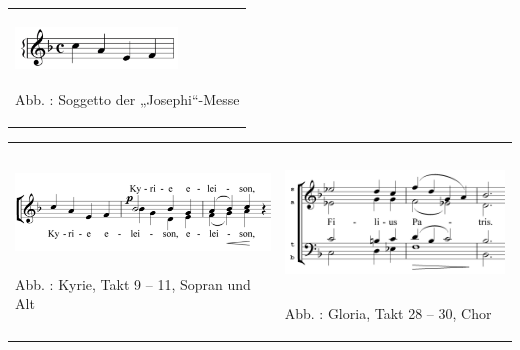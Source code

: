 \begin{center}
\begin{minipage}{4.736cm}
\begin{flushleft}
\tablefirsthead{}
\tablehead{}
\tabletail{}
\tablelasttail{}
\begin{supertabular}{m{4.5360003cm}}

\includegraphics[width=4.307cm,height=1.233cm]{pictures/zulassungsarbeit-img108.png}

Abb. : Soggetto der „Josephi“-Messe\\
\end{supertabular}
\end{flushleft}
\end{minipage}
\end{center}
\begin{flushleft}
\tablefirsthead{}
\tablehead{}
\tabletail{}
\tablelasttail{}
\begin{supertabular}{m{8.196cm}m{7.783cm}}

\includegraphics[width=7.678cm,height=2.325cm]{pictures/zulassungsarbeit-img109.png}

Abb. : Kyrie, Takt 9 – 11, Sopran und Alt &

\includegraphics[width=6.592cm,height=3.339cm]{pictures/zulassungsarbeit-img110.png}

Abb. : Gloria, Takt 28 – 30, Chor\\
\end{supertabular}
\end{flushleft}

